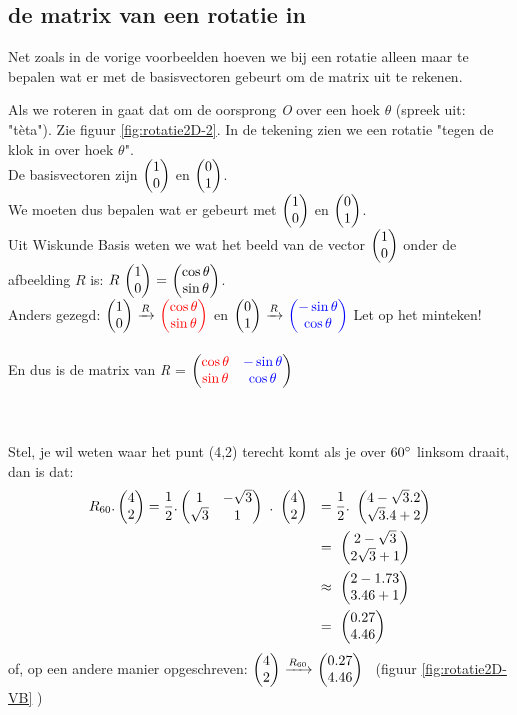 \documentclass[hidelinks, a4wide, 12pt,  twoside]{book}
\begin{document}
\subsection{de matrix van een rotatie in \RT}
Net zoals in de vorige voorbeelden hoeven we bij een rotatie alleen maar te bepalen wat er met de basisvectoren gebeurt om de matrix uit te rekenen. 


Als we roteren in \RT gaat dat om de oorsprong \textit{O} over een hoek $\theta$ (spreek uit: "tèta"). Zie figuur  \ref{fig:rotatie2D-2}. In de tekening zien we een rotatie "tegen de klok in over hoek $\theta$". \\De basisvectoren zijn $ \vectwee{1}{0}   $ en   $ \vectwee{0}{1}   $. \\We moeten dus bepalen wat er gebeurt met $ \vectwee{1}{0}   $ en   $ \vectwee{0}{1}   $.\\
Uit Wiskunde Basis weten we wat het beeld van de vector $\vectwee{1}{0} $ onder de afbeelding $R$ is: $ R \ \vectwee{1}{0}  \  = \  \vectwee{\cos \theta}{\sin \theta} $. \\ Anders gezegd:
$ \vectwee{1}{0}   \  \xrightarrow{R}  \ \vectwee[red]{\cos \theta}{\sin \theta} $  \quad en  \quad 
$ \vectwee{0}{1}   \  \xrightarrow{R}  \ \vectwee[blue]{-\sin \theta}{\cos \theta} $  \quad Let op het minteken!\\ \\
En dus is de matrix van \textit{R} =  
$  \begin{pmatrix}  {\color{red}\cos \theta} & {\color{blue}-\sin \theta}  \\  {\color{red}\sin \theta} & {\color{blue}\cos \theta} \end{pmatrix} $\\ \\ \\


Stel, je wil weten waar het punt (4,2) terecht komt als je over  $ 60 \degree$ linksom draait, dan is dat:
\begin{align*}
R_{60} . \mattwee{4}{2} 
=\frac{1}{2} . \mattwee{1 & -\sqrt{3} }{\sqrt{3} & 1} \ . \  \mattwee{4}{2}  \ \ 
& = \frac{1}{2}.\  \mattwee{4  - \sqrt{3}.2 }    { \sqrt{3}.4 + 2} \\ 
& = \  \mattwee{2-\sqrt{3}}{2\sqrt{3}+1} \\ 
& \approx \  \mattwee{2-1.73}{3.46+1}  \\ 
&= \  \mattwee{0.27}{4.46}  
\end{align*}
of, op een andere manier opgeschreven: 
$ \vectwee{4}{2}   \  \xrightarrow{R_{60}}  \ \vectwee{0.27}{4.46} $ \ (figuur \ref{fig:rotatie2D-VB}  )
\end{document}
